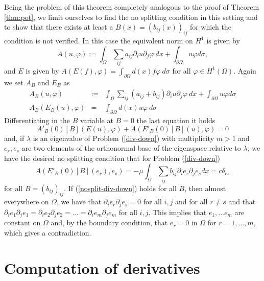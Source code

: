 \documentclass[a4paper,reqno,11pt,oneside]{amsart}
\theoremstyle{plain}
\theoremstyle{plain}
\theoremstyle{plain}
\theoremstyle{remark}
\begin{document}
Being the problem of this theorem completely analogous to the proof of Theorem \ref{thm:pot}, 
we limit ourselves to find the no splitting condition in this setting and to show that there exists at least a $B(x)=(b_{ij}(x))_{ij}$ for which the condition is not verified.
In this case the equivalent norm on $H^1$ is given by 
\begin{equation}
{A} (u,\varphi) :=\int_{\Omega} \sum_{ij} a_{ij}\partial_i u \partial_j  \varphi \ dx +\int_{\partial \Omega } u\varphi d\sigma,   
\end{equation}
and $E$ is given by $ {A} (E(f),\varphi)=\int_{\partial \Omega} d(x)f\varphi\  d\sigma $ for all $\varphi \in H^1 (\Omega)$. 
Again we set ${A}_B $  and $E_B$ as
\begin{eqnarray}
    {A}_B(u,\varphi) &:=&\int_{\Omega} \sum_{ij} (a_{ij}+b_{ij})\partial_i u \partial_j  \varphi \ dx +\int_{\partial \Omega } u\varphi d\sigma  \\
    {A}_B (E_B(u),\varphi)&=&\int_{\partial \Omega} d(x)u\varphi\  d\sigma 
\end{eqnarray}
Differentiating in the $B$ variable at $B=0$ the last equation it holds
\begin{equation}
 {A'}_B(0)[B] (E(u),\varphi)+{A} (E'_B(0)[B](u),\varphi)=0 
\end{equation}
and, if $\lambda$ is an eigenvalue of Problem (\ref{div-down}) with multiplicity $m>1$ and $e_r,e_s$ are two elements of the orthonormal base of the eigenspace relative to $\lambda$, we have the desired no splitting condition that for Problem (\ref{div-down}) 
\begin{equation}\label{nosplit-div-down}
    {A} (E'_B(0)[B](e_r),e_s)=-\mu \int_{ \Omega}
    \sum_{ij}b_{ij} \partial_i e_r \partial_j e_sdx =c\delta_{es} 
\end{equation}
for all $B=(b_{ij})_{ij}$. 
If (\ref{nosplit-div-down}) holds for all $B$, then almost everywhere on $\Omega$, we have that $\partial_i e_r\partial_j e_s=0$ for all $i,j$ and for all $r\neq s$ and that $\partial_i e_1\partial_j e_1=\partial_i e_2\partial_j e_2=\dots =\partial_i e_m\partial_j e_m$   for all $i,j$. 
This implies that $e_1,\dots e_m$ are constant on $\Omega$ and, by the boundary condition, that $e_r=0$ in $\Omega$ for $r=1,\dots, m$, which gives a contradiction.


\appendix


\section{Computation of derivatives}\label{Sec:der}
\end{document}
